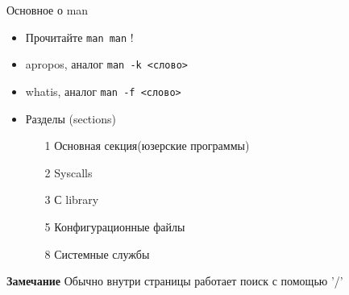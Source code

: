 \begin{frame}[fragile]{Основное о man}
		\begin{itemize}
			\item Прочитайте {\tt man man} !
			\item apropos, аналог {\tt man -k <слово>}
                        \item whatis, аналог {\tt man -f <слово>} 
			\item Разделы (sections)
				\begin{itemize}
					\item[1] Основная секция(юзерские программы)
					\item[2] Syscalls
					\item[3] С library
					\item[5] Конфигурационные файлы
					\item[8] Системные службы
				\end{itemize}
		\end{itemize}
	  \textbf{Замечание}
	  Обычно внутри страницы работает поиск с помощью '/'
	
\end{frame}


